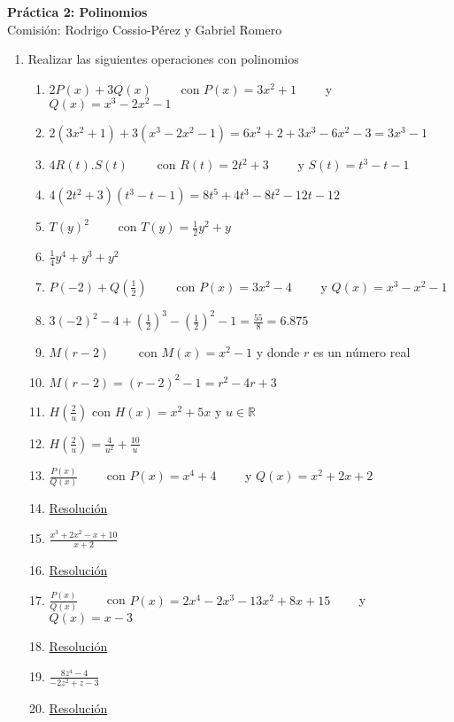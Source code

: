 \documentclass[a4paper]{article}
\newcommand{\answer}{\item[**]}
\newcommand{\exercise}{\item}
\newcommand{\df}[2]{\displaystyle\frac{#1}{#2}}
\begin{document}
\noindent \hrulefill 
\vspace{-7pt}
\begin{center} 
	\textbf{ Práctica 2: Polinomios } \\
	Comisión: Rodrigo Cossio-Pérez y Gabriel Romero
\end{center}
\vspace{-10pt}
\hrulefill


\begin{enumerate}

	\exercise Realizar las siguientes operaciones con polinomios
	\begin{enumerate} [label=(\alph*)]
		
		\item $2P(x)+3Q(x)$ ~~~~con $P(x)=3x^2+1$ ~~~~y $Q(x)=x^3-2x^2-1$
		\answer $2(3x^2+1)+3(x^3-2x^2-1)=6x^2+2+3x^3-6x^2-3=3x^3-1$

		\item $4R(t).S(t)$ ~~~~con $R(t)=2t^2+3$ ~~~~y $S(t)=t^3-t-1$
		\answer $4(2t^2+3)(t^3-t-1)=8t^5+4t^3-8t^2-12t-12$ 

		\item $T(y)^2$ ~~~~con $T(y)=\df{1}{2}y^2+y$
		\answer $\df{1}{4}y^4+y^3+y^2$

		\item $P(-2)+Q\left(\df{1}{2}\right)$ ~~~~con $P(x)=3x^2-4$ ~~~~y $Q(x)=x^3-x^2-1$
		\answer $3(-2)^2-4+\left(\df{1}{2}\right)^3-\left(\df{1}{2}\right)^2-1=\df{55}{8} = 6.875$

		\item $M(r-2)$ ~~~~con $M(x)=x^2-1$ y donde $r$ es un número real
		\answer $M(r-2)=(r-2)^2-1=r^2-4r+3$

		\item $H\left(\df{2}{u}\right)$ con $H(x)=x^2+5x$ y $u \in \mathbb{R}$
		\answer $H\left(\df{2}{u}\right)=\df{4}{u^2}+\df{10}{u}$

		\item $\df{P(x)}{Q(x)}$ ~~~~con $P(x)=x^4+4$ ~~~~y $Q(x)=x^2+2x+2$
		\answer \href{https://youtu.be/DWDi7BKAKbc}{Resolución}

		\item $\df{x^3+2x^2-x+10}{x+2}$
		\answer \href{https://youtu.be/bfCWsvZfFq0}{Resolución}

		\item $\df{P(x)}{Q(x)}$ ~~~~con $P(x)=2x^4-2x^3-13x^2+8x+15$ ~~~~y $Q(x)=x-3$
		\answer \href{https://youtu.be/W3HcTD4IC94}{Resolución}

		\item $\df{8z^4-4}{-2z^2+z-3}$
		\answer \href{https://youtu.be/0Dw3MAwrA34}{Resolución}


\end{enumerate}
\end{enumerate}
\end{document}
